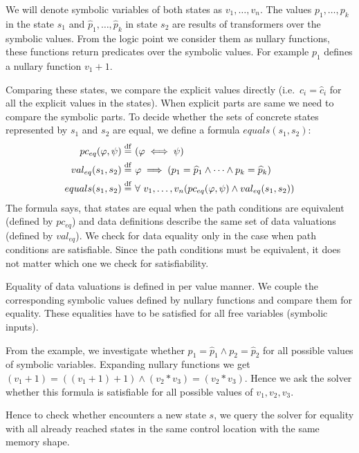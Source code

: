We will denote symbolic variables of both states as $v_1, \dots, v_n$. The
values $p_1, \dots, p_k$ in the state $s_1$ and $\widehat{p}_1, \dots,
\widehat{p}_k$ in state $s_2$ are results of transformers over the symbolic
values. From the logic point we consider them as nullary functions, these
functions return predicates over the symbolic values. For example $p_1$ defines
a nullary function $v_1 + 1$.

Comparing these states, we compare the explicit values directly (i.e.~$c_i =
\widehat{c}_i$ for all the explicit values in the states).  When explicit parts
are same we need to compare the symbolic parts. To decide whether the sets of
concrete states represented by $s_1$ and $s_2$ are equal, we define a formula
$equals(s_1, s_2)$:
\begin{equation*}
\begin{aligned}
    pc_{eq}(\varphi, \psi) \stackrel{\mathrm{df}}{=} & ~(\varphi \iff \psi) \\
    val_{eq}(s_1, s_2) \stackrel{\mathrm{df}}{=} & ~\varphi \implies (p_1 = \widehat{p}_1 \wedge \dots \wedge p_k = \widehat{p}_k ) \\
    equals(s_1, s_2) \stackrel{\mathrm{df}}{=} & ~\forall~v_1,\dots, v_n (pc_{eq}(\varphi, \psi)
    \wedge val_{eq}(s_1, s_2))
\end{aligned}
\end{equation*}
The formula says, that states are equal when the path conditions are
equivalent (defined by $pc_{eq}$) and data definitions describe the same set
of data valuations (defined by $val_{eq}$). We check for data equality only in
the case when path conditions are satisfiable. Since the path conditions must
be equivalent, it does not matter which one we check for satisfiability.

Equality of data valuations is defined in per value manner. We couple the
corresponding symbolic values defined by nullary functions and compare them for
equality. These equalities have to be satisfied for all free variables (symbolic
inputs).

From the example, we investigate whether $p_1 = \widehat{p}_1 \wedge p_2 =
\widehat{p}_2$ for all possible values of symbolic variables. Expanding nullary
functions we get $(v_1 + 1) = ((v_1 + 1) + 1) \wedge (v_2 * v_3) = (v_2 * v_3)$. Hence
we ask the \SMT solver whether this formula is satisfiable for all possible
values of $v_1, v_2, v_3$.

Hence to check whether \DIVINE encounters a new state $s$, we query the \SMT solver
for equality with all already reached states in the same control location with the same memory shape.




